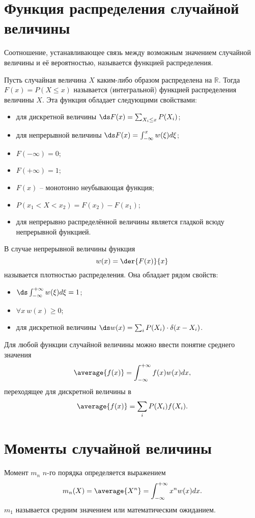 \section{Функция распределения случайной величины}

Соотношение, устанавливающее связь между возможным значением случайной величины
и её вероятностью, называется функцией распределения.

Пусть случайная величина \( X \) каким-либо образом распределена на
\( \mathbb{R} \). Тогда \( F(x) = P(X \le x) \) называется (интегральной)
функцией распределения величины \( X \). Эта функция обладает следующими
свойствами:
\begin{itemize}
    \item для дискретной величины \( \ds F(x) = \sum_{X_i \le x}P(X_i) \);
    \item для непрерывной величины \( \ds F(x) = \int_{-\infty}^x w(\xi)d\xi \);
    \item \( F(-\infty) = 0 \);
    \item \( F(+\infty) = 1 \);
    \item \( F(x) \) -- монотонно неубывающая функция;
    \item \( P(x_1 < X < x_2) = F(x_2) - F(x_1) \);
    \item для непрерывно распределённой величины является гладкой всюду
        непрерывной функцией.
\end{itemize}
В случае непрерывной величины функция
\[
    w(x) = \der{F(x)}{x}
\]
называется плотностью распределения. Она обладает рядом свойств:
\begin{itemize}
    \item \( \ds \int_{-\infty}^{+\infty} w(\xi) d\xi = 1 \);
    \item \( \forall x\ w(x) \ge 0 \);
    \item для дискретной величины
        \( \ds w(x) = \sum_i P(X_i) \cdot \delta(x - X_i) \).
\end{itemize}

Для любой функции случайной величины можно ввести понятие среднего значения
\[
    \average{f(x)} = \int_{-\infty}^{+\infty}f(x)w(x)dx,
\]
переходящее для дискретной величины в
\[
    \average{f(x)} = \sum_i P(X_i)f(X_i).
\]

\section{Моменты случайной величины}

Момент \( m_n \) \( n \)-го порядка определяется выражением
\[
    m_n(X) = \average{X^n} = \int_{-\infty}^{+\infty} x^n w(x) dx.
\]
\( m_1 \) называется средним значением или математическим ожиданием.

